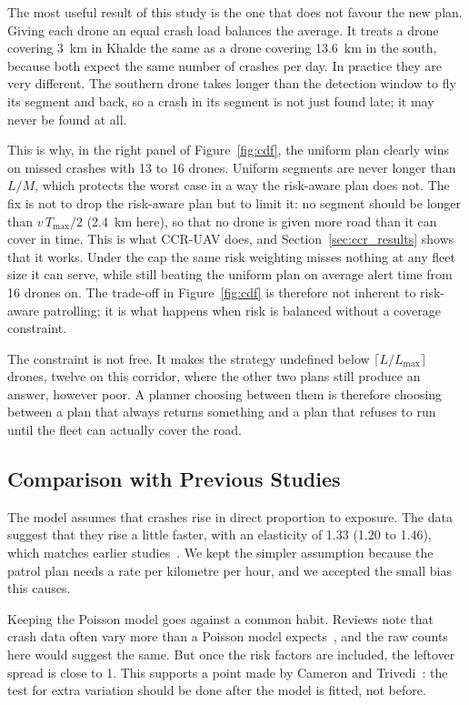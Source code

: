 \documentclass[11pt]{article}
\begin{document}
The most useful result of this study is the one that does not favour the new
plan. Giving each drone an equal crash load balances the average. It treats a
drone covering 3~km in Khalde the same as a drone covering 13.6~km in the south,
because both expect the same number of crashes per day. In practice they are
very different. The southern drone takes longer than the detection window to
fly its segment and back, so a crash in its segment is not just found late; it
may never be found at all.

This is why, in the right panel of Figure~\ref{fig:cdf}, the uniform plan clearly
wins on missed crashes with 13 to 16 drones. Uniform segments are never longer
than $L/M$, which protects the worst case in a way the risk-aware plan does not.
The fix is not to drop the risk-aware plan but to limit it: no segment should
be longer than $v\,T_{\max}/2$ (2.4~km here), so that no drone is given more
road than it can cover in time. This is what CCR-UAV does, and
Section~\ref{sec:ccr_results} shows that it works. Under the cap the same
risk weighting misses nothing at any fleet size it can serve, while still
beating the uniform plan on average alert time from 16 drones on. The
trade-off in Figure~\ref{fig:cdf} is therefore not inherent to risk-aware
patrolling; it is what happens when risk is balanced without a coverage
constraint.

The constraint is not free. It makes the strategy undefined below
$\lceil L/L_{\max}\rceil$ drones, twelve on this corridor, where the other
two plans still produce an answer, however poor. A planner choosing between
them is therefore choosing between a plan that always returns something and
a plan that refuses to run until the fleet can actually cover the road.

\subsection{Comparison with Previous Studies}

The model assumes that crashes rise in direct proportion to exposure. The data
suggest that they rise a little faster, with an elasticity of 1.33 (1.20 to
1.46), which matches earlier studies~\cite{lordmannering2010}. We kept the
simpler assumption because the patrol plan needs a rate per kilometre per hour,
and we accepted the small bias this causes.

Keeping the Poisson model goes against a common habit. Reviews note that crash
data often vary more than a Poisson model expects~\cite{lordmannering2010,
mannering2014}, and the raw counts here would suggest the same. But once the
risk factors are included, the leftover spread is close to 1. This supports a
point made by Cameron and Trivedi~\cite{cameron1990}: the test for extra
variation should be done after the model is fitted, not before.
\end{document}
